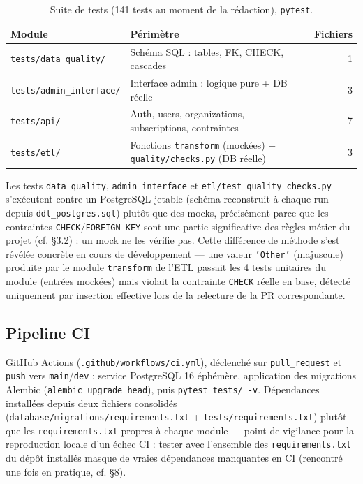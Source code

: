 \documentclass{article}
\begin{document}
\begin{table}[H]
\centering
\small
\begin{tabular}{@{}llr@{}}
\toprule
\textbf{Module} & \textbf{Périmètre} & \textbf{Fichiers} \\
\midrule
\texttt{tests/data\_quality/} & Schéma SQL : tables, FK, CHECK, cascades & 1 \\
\texttt{tests/admin\_interface/} & Interface admin : logique pure + DB réelle & 3 \\
\texttt{tests/api/} & Auth, users, organizations, subscriptions, contraintes & 7 \\
\texttt{tests/etl/} & Fonctions \texttt{transform} (mockées) + \texttt{quality/checks.py} (DB réelle) & 3 \\
\bottomrule
\end{tabular}
\caption{Suite de tests (141 tests au moment de la rédaction), \texttt{pytest}.}
\end{table}

Les tests \texttt{data\_quality}, \texttt{admin\_interface} et \texttt{etl/test\_quality\_checks.py} s'exécutent contre un PostgreSQL jetable (schéma reconstruit à chaque run depuis \texttt{ddl\_postgres.sql}) plutôt que des mocks, précisément parce que les contraintes \texttt{CHECK}/\texttt{FOREIGN KEY} sont une partie significative des règles métier du projet (cf. \S3.2) : un mock ne les vérifie pas. Cette différence de méthode s'est révélée concrète en cours de développement — une valeur \texttt{'Other'} (majuscule) produite par le module \texttt{transform} de l'ETL passait les 4 tests unitaires du module (entrées mockées) mais violait la contrainte \texttt{CHECK} réelle en base, détecté uniquement par insertion effective lors de la relecture de la PR correspondante.

\subsection{Pipeline CI}

GitHub Actions (\texttt{.github/workflows/ci.yml}), déclenché sur \texttt{pull\_request} et \texttt{push} vers \texttt{main}/\texttt{dev} : service PostgreSQL 16 éphémère, application des migrations Alembic (\texttt{alembic upgrade head}), puis \texttt{pytest tests/ -v}. Dépendances installées depuis deux fichiers consolidés (\texttt{database/migrations/requirements.txt} + \texttt{tests/requirements.txt}) plutôt que les \texttt{requirements.txt} propres à chaque module — point de vigilance pour la reproduction locale d'un échec CI : tester avec l'ensemble des \texttt{requirements.txt} du dépôt installés masque de vraies dépendances manquantes en CI (rencontré une fois en pratique, cf. \S8).
\end{document}
